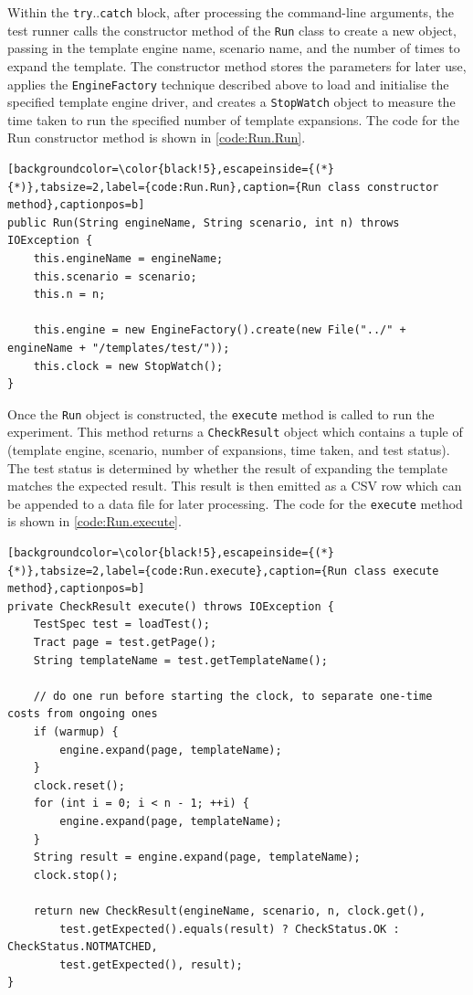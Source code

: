 Within the \verb!try!..\verb!catch! block, after processing the command-line arguments, the test runner calls the constructor method of the \verb!Run! class to create a new object, passing in the template engine name, scenario name, and the number of times to expand the template. The constructor method stores the parameters for later use, applies the \verb!EngineFactory! technique described above to load and initialise the specified template engine driver, and creates a \verb!StopWatch! object to measure the time taken to run the specified number of template expansions. The code for the Run constructor method is shown in \autoref{code:Run.Run}.

\begin{lstlisting}[backgroundcolor=\color{black!5},escapeinside={(*}{*)},tabsize=2,label={code:Run.Run},caption={Run class constructor method},captionpos=b]
public Run(String engineName, String scenario, int n) throws IOException {
    this.engineName = engineName;
    this.scenario = scenario;
    this.n = n;

    this.engine = new EngineFactory().create(new File("../" + engineName + "/templates/test/"));
    this.clock = new StopWatch();
}
\end{lstlisting}

Once the \verb!Run! object is constructed, the \verb!execute! method is called to run the experiment. This method returns a \verb!CheckResult! object which contains a tuple of (template engine, scenario, number of expansions, time taken, and test status). The test status is determined by whether the result of expanding the template matches the expected result. This result is then emitted as a CSV row which can be appended to a data file for later processing. The code for the \verb!execute! method is shown in \autoref{code:Run.execute}.

\begin{lstlisting}[backgroundcolor=\color{black!5},escapeinside={(*}{*)},tabsize=2,label={code:Run.execute},caption={Run class execute method},captionpos=b]
private CheckResult execute() throws IOException {
    TestSpec test = loadTest();
    Tract page = test.getPage();
    String templateName = test.getTemplateName();

    // do one run before starting the clock, to separate one-time costs from ongoing ones
    if (warmup) {
        engine.expand(page, templateName);
    }
    clock.reset();
    for (int i = 0; i < n - 1; ++i) {
        engine.expand(page, templateName);
    }
    String result = engine.expand(page, templateName);
    clock.stop();

    return new CheckResult(engineName, scenario, n, clock.get(),
        test.getExpected().equals(result) ? CheckStatus.OK : CheckStatus.NOTMATCHED,
        test.getExpected(), result);
}
\end{lstlisting}

